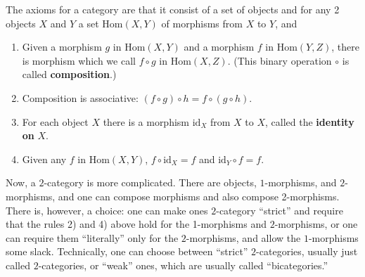 \documentclass{article}
\def\tightlist{}
\begin{document}
The axioms for a category are that it consist of a set of objects and
for any 2 objects \(X\) and \(Y\) a set \(\mathrm{Hom}(X,Y)\) of
morphisms from \(X\) to \(Y\), and

\begin{enumerate}
\def\labelenumi{\arabic{enumi}.}
\tightlist
\item
  Given a morphism \(g\) in \(\mathrm{Hom}(X,Y)\) and a morphism \(f\)
  in \(\mathrm{Hom}(Y,Z)\), there is morphism which we call
  \(f \circ g\) in \(\mathrm{Hom}(X,Z)\). (This binary operation
  \(\circ\) is called \textbf{composition}.)
\item
  Composition is associative:
  \((f \circ g) \circ h = f \circ (g \circ h)\).
\item
  For each object \(X\) there is a morphism \(\mathrm{id}_X\) from \(X\)
  to \(X\), called the \textbf{identity on} \(X\).
\item
  Given any \(f\) in \(\mathrm{Hom}(X,Y)\),
  \(f \circ \mathrm{id}_X = f\) and \(\mathrm{id}_Y \circ f = f\).
\end{enumerate}

Now, a \(2\)-category is more complicated. There are objects,
\(1\)-morphisms, and \(2\)-morphisms, and one can compose morphisms and
also compose 2-morphisms. There is, however, a choice: one can make ones
\(2\)-category ``strict'' and require that the rules 2) and 4) above
hold for the 1-morphisms and \(2\)-morphisms, or one can require them
``literally'' only for the \(2\)-morphisms, and allow the
\(1\)-morphisms some slack. Technically, one can choose between
``strict'' \(2\)-categories, usually just called \(2\)-categories, or
``weak'' ones, which are usually called ``bicategories.''
\end{document}
